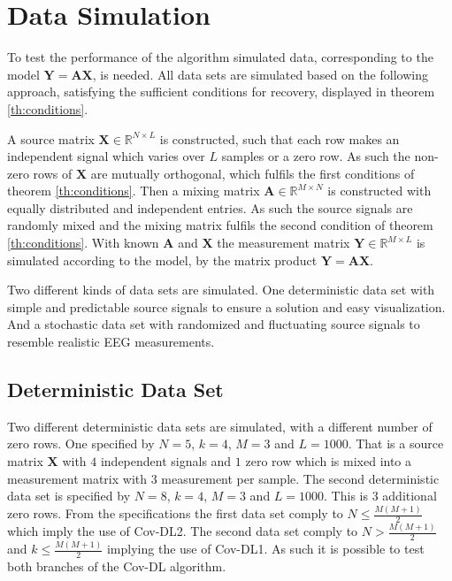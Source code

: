\section{Data Simulation}\label{sec:dataset}
To test the performance of the algorithm simulated data, corresponding to the model $\mathbf{Y} = \mathbf{A}\mathbf{X}$, is needed. All data sets are simulated based on the following approach, satisfying the sufficient conditions for recovery, displayed in theorem \ref{th:conditions}.
 
A source matrix $\mathbf{X} \in \mathbb{R}^{N \times L}$ is constructed, such that each row makes an independent signal which varies over $L$ samples or a zero row. 
As such the non-zero rows of $\mathbf{X}$ are mutually orthogonal, which fulfils the first conditions of theorem \ref{th:conditions}.   
Then a mixing matrix $\mathbf{A} \in \mathbb{R}^{M \times N}$ is constructed with equally distributed and independent entries. 
As such the source signals are randomly mixed and the mixing matrix fulfils the second condition of theorem \ref{th:conditions}.
With known $\mathbf{A}$ and $\mathbf{X}$ the measurement matrix $\mathbf{Y} \in \mathbb{R}^{M \times L}$ is simulated according to the model, by the matrix product $\mathbf{Y} = \mathbf{AX}$.  

Two different kinds of data sets are simulated.
One deterministic data set with simple and predictable source signals to ensure a solution and easy visualization.
And a stochastic data set with randomized and fluctuating source signals to resemble realistic EEG measurements.

\subsection{Deterministic Data Set}\label{subseg_simpledata}
Two different deterministic data sets are simulated, with a different number of zero rows. 
One specified by $N = 5$, $k = 4$, $M = 3$ and $L = 1000$. That is a source matrix $\mathbf{X}$ with $4$ independent signals and $1$ zero row which is mixed into a measurement matrix with $3$ measurement per sample.  
The second deterministic data set is specified by $N = 8$, $k = 4$, $M = 3$ and $L = 1000$. This is 3 additional zero rows.
From the specifications the first data set comply to $N \leq \frac{M(M+1)}{2}$ which imply the use of Cov-DL2.
The second data set comply to $N > \frac{M(M+1)}{2}$ and $k \leq \frac{M(M+1)}{2}$ implying the use of Cov-DL1. 
As such it is possible to test both branches of the Cov-DL algorithm. 
     
